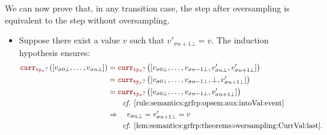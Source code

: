 \begin{skippableproof}
    We can now prove that, in any transition case, the step after oversampling is equivalent to the
    step without oversampling.
    \begin{itemize}
        \item Suppose there exist a value $v$ such that $v'_{\sigma n+1\bot} = v$.
              The induction hypothesis ensures:
              \begin{align*}
                  \CurrVal{\mayB{ty_\sigma}}{[v_{\sigma 0\bot}, \dots, v_{\sigma n\bot}]} & = \CurrVal{\mayB{ty_\sigma}}{[v_{\sigma 0\bot}, \dots, v_{\sigma n-1\bot}, v'_{\sigma n\bot}, v'_{\sigma n+1\bot}]} \\
                                                                                          & = \CurrVal{\mayB{ty_\sigma}}{[v_{\sigma 0\bot}, \dots, v_{\sigma n-1\bot}, \bot, v'_{\sigma n+1\bot}]}              \\
                                                                                          & = \CurrVal{\mayB{ty_\sigma}}{[v_{\sigma 0\bot}, \dots, v_{\sigma n-1\bot}, v'_{\sigma n+1\bot}]}                    \\
                                                                                          & \qquad \text{\cf \Cref{rule:semantics:grfrp:opsem:aux:intoVal:event}}                                               \\
                                                                                          & \Rightarrow \quad v_{\sigma n\bot} = v'_{\sigma n+1\bot} = v                                                        \\
                                                                                          & \qquad \text{\cf \Cref{lem:semantics:grfrp:theorems:oversampling:CurrVal:last}}.
              \end{align*}


\end{itemize}
\end{skippableproof}
